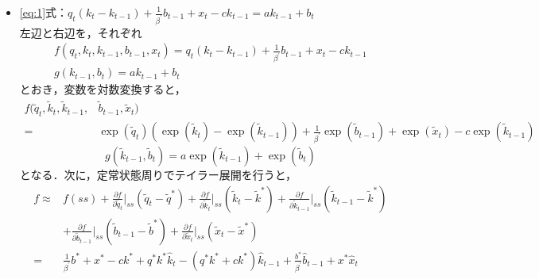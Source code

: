 \documentclass[dvipdfmx]{jlreq}
\begin{document}
\begin{itemize}
  \item \eqref{eq:1}式：$q_t(k_t - k_{t-1}) + \frac{1}{\beta^\prime} b_{t-1} + x_t - c k_{t-1} = a k_{t-1} + b_t$ \\
    左辺と右辺を，それぞれ
    \begin{gather}
      f(q_t, k_t, k_{t-1}, b_{t-1}, x_t) = q_t(k_t - k_{t-1}) + \frac{1}{\beta^\prime} b_{t-1} + x_t - c k_{t-1} \\
      g(k_{t-1}, b_t) = a k_{t-1} + b_t
    \end{gather}
    とおき，変数を対数変換すると，
    \begin{equation}
      \begin{split}
        f(\widetilde{q}_t, \widetilde{k}_t, \widetilde{k}_{t-1}, &\widetilde{b}_{t-1}, \widetilde{x}_t) \\
        =& \exp(\widetilde{q}_t) (\exp(\widetilde{k}_t) - \exp(\widetilde{k}_{t-1})) + \frac{1}{\beta^\prime} \exp(\widetilde{b}_{t-1}) + \exp(\widetilde{x}_t) - c \exp(\widetilde{k}_{t-1}) 
      \end{split}
    \end{equation}
    \begin{equation}
      g(\widetilde{k}_{t-1}, \widetilde{b}_t) = a \exp(\widetilde{k}_{t-1}) + \exp(\widetilde{b}_t)
    \end{equation}
    となる．次に，定常状態周りでテイラー展開を行うと，
    \begin{equation}
      \begin{split}
        f \approx& f(ss)
        + \frac{\partial f}{\partial \widetilde{q}_t} \bigg|_{ss} (\widetilde{q}_t - \widetilde{q}^*)
        + \frac{\partial f}{\partial \widetilde{k}_t} \bigg|_{ss} (\widetilde{k}_t - \widetilde{k}^*)
        + \frac{\partial f}{\partial \widetilde{k}_{t-1}} \bigg|_{ss} (\widetilde{k}_{t-1} - \widetilde{k}^*) \\
        &+ \frac{\partial f}{\partial \widetilde{b}_{t-1}} \bigg|_{ss} (\widetilde{b}_{t-1} - \widetilde{b}^*)
        + \frac{\partial f}{\partial \widetilde{x}_t} \bigg|_{ss} (\widetilde{x}_t - \widetilde{x}^*) \\
        =& \frac{1}{\beta^\prime} b^* + x^* - c k^*
        + q^* k^* \widehat{k}_t
        - (q^* k^* + c k^*) \widehat{k}_{t-1}
        + \frac{b^*}{\beta^\prime} \widehat{b}_{t-1}
        + x^* \widehat{x}_t
      \end{split}
    \end{equation}
    \begin{equation}

\end{equation}
\end{itemize}
\end{document}
